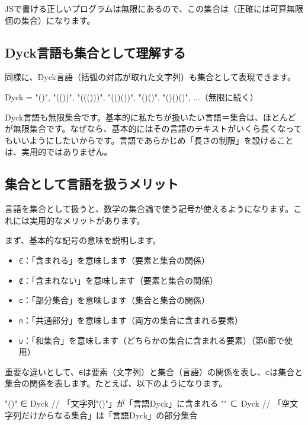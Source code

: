 \enlargethispage{\baselineskip}JSで書ける正しいプログラムは無限にあるので、この集合は（正確には可算無限個の集合）になります。

\subsection{Dyck言語も集合として理解する}

同様に、Dyck言語（括弧の対応が取れた文字列）も集合として表現できます。

\begin{codescreen}{}
Dyck = {
  "()",
  "(())",
  "((()))",
  "(()())",
  "()()",
  "()()()",
  ...（無限に続く）
}
\end{codescreen}

Dyck言語も無限集合です。基本的に私たちが扱いたい言語＝集合は、ほとんどが無限集合です。なぜなら、基本的にはその言語のテキストがいくら長くなってもいいようにしたいからです。言語であらかじめ「長さの制限」を設けることは、実用的ではありません。

\subsection{集合として言語を扱うメリット}

言語を集合として扱うと、数学の集合論で使う記号が使えるようになります。これには実用的なメリットがあります。

まず、基本的な記号の意味を説明します。

\begin{itemize}
\item
  \texttt{∈}：「含まれる」を意味します（要素と集合の関係）
\item
  \texttt{∉}：「含まれない」を意味します（要素と集合の関係）
\item
  \texttt{⊂}：「部分集合」を意味します（集合と集合の関係）
\item
  \texttt{∩}：「共通部分」を意味します（両方の集合に含まれる要素）
\item
  \texttt{∪}：「和集合」を意味します（どちらかの集合に含まれる要素）（第6節で使用）
\end{itemize}

重要な違いとして、\texttt{∈}は要素（文字列）と集合（言語）の関係を表し、\texttt{⊂}は集合と集合の関係を表します。たとえば、以下のようになります。

\begin{codescreen}{}
"()" ∈ Dyck        // 「文字列"()"」が「言語Dyck」に含まれる
{""} ⊂ Dyck        // 「空文字列だけからなる集合」は「言語Dyck」の部分集合
\end{codescreen}


